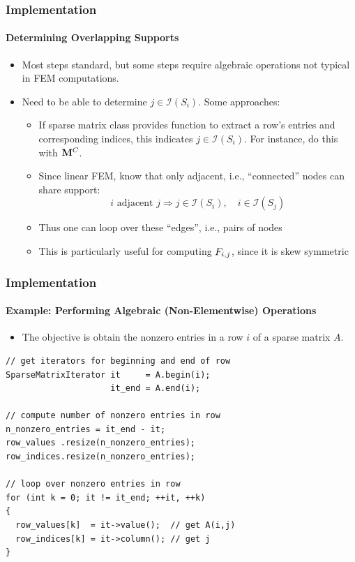 \documentclass{beamer}
\begin{document}
\begin{frame}
\frametitle{Implementation}
\framesubtitle{Determining Overlapping Supports}

\begin{itemize}
   \item Most steps standard, but some steps require algebraic operations
      not typical in FEM computations.
   \item Need to be able to determine $j\in\mathcal{I}(S_i)$.
      Some approaches:
      \begin{itemize}
         \item If sparse matrix class provides function to extract
            a row's entries and corresponding indices, this indicates
            $j\in\mathcal{I}(S_i)$. For instance, do this with $\mathbf{M}^C$.
         \item Since linear FEM, know that only adjacent, i.e., ``connected''
            nodes can share support:
            \[i \mbox{ adjacent } j\Rightarrow j\in\mathcal{I}(S_i),\quad
               i\in\mathcal{I}(S_j)\]
            \item Thus one can loop over these ``edges'', i.e., pairs of nodes
            \item This is particularly useful for computing $F_{i,j}$, since it
               is skew symmetric
      \end{itemize}
\end{itemize}

\end{frame}
\begin{frame}[fragile=singleslide]
\frametitle{Implementation}
\framesubtitle{Example: Performing Algebraic (Non-Elementwise) Operations}

\begin{itemize}
   \item The objective is obtain the nonzero entries in a row $i$ of a
     sparse matrix $A$.
\end{itemize}

\begin{lstlisting}
// get iterators for beginning and end of row
SparseMatrixIterator it     = A.begin(i);
                     it_end = A.end(i);

// compute number of nonzero entries in row
n_nonzero_entries = it_end - it;
row_values .resize(n_nonzero_entries);
row_indices.resize(n_nonzero_entries);

// loop over nonzero entries in row
for (int k = 0; it != it_end; ++it, ++k)
{
  row_values[k]  = it->value();  // get A(i,j)
  row_indices[k] = it->column(); // get j
}
\end{lstlisting}

\end{frame}
\end{document}
